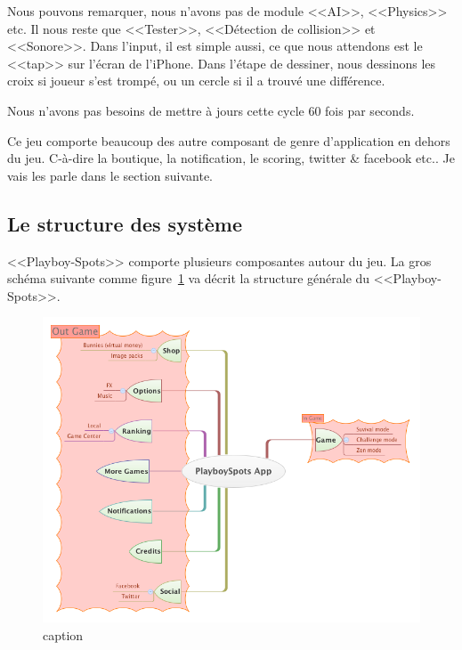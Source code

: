 Nous pouvons remarquer, nous n'avons pas de module <<AI>>, <<Physics>> etc. Il nous reste que <<Tester>>, <<Détection de collision>> et <<Sonore>>. Dans l'input, il est simple aussi, ce que nous attendons est le <<tap>> sur l'écran de l'iPhone. Dans l'étape de dessiner, nous dessinons les croix si joueur s'est trompé, ou un cercle si il a trouvé une différence.

Nous n'avons pas besoins de mettre à jours cette cycle 60 fois par seconds. 

Ce jeu comporte beaucoup des autre composant de genre d'application en dehors du jeu. C-à-dire la boutique, la notification, le scoring, twitter \& facebook etc..
Je vais les parle dans le section suivante.


\subsection{Le structure des système} %

<<Playboy-Spots>> comporte plusieurs composantes autour du jeu. La gros schéma suivante comme figure~\ref{fig:XMinds_PlayboySpotsApp} va décrit la structure générale du <<Playboy-Spots>>.
\begin{figure}[htbp]
	\centering
		\includegraphics[width=6in]{XMinds/PlayboySpotsApp.png}
	\caption{caption}
	\label{fig:XMinds_PlayboySpotsApp}
\end{figure}



